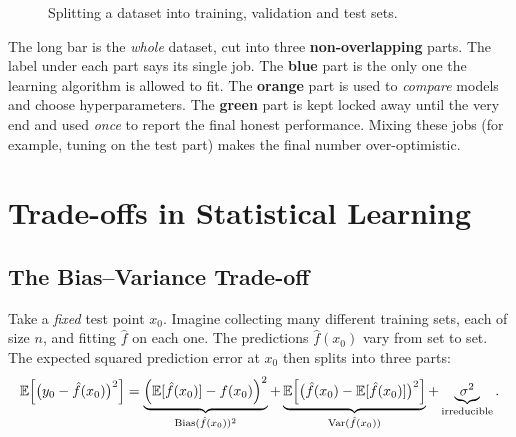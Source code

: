 \begin{figure}[!htbp]
\centering
{}
\caption{Splitting a dataset into training, validation and test sets.}\label{fig:split}
\end{figure}

\begin{explain}
The long bar is the \emph{whole} dataset, cut into three \textbf{non-overlapping} parts. The label under each part says its single job. The \textbf{blue} part is the only one the learning algorithm is allowed to fit. The \textbf{orange} part is used to \emph{compare} models and choose hyperparameters. The \textbf{green} part is kept locked away until the very end and used \emph{once} to report the final honest performance. Mixing these jobs (for example, tuning on the test part) makes the final number over-optimistic.
\end{explain}

\section{Trade-offs in Statistical Learning}

\subsection{The Bias--Variance Trade-off}

Take a \emph{fixed} test point $x_0$. Imagine collecting many different training sets, each of size $n$, and fitting $\hat f$ on each one. The predictions $\hat f(x_0)$ vary from set to set. The expected squared prediction error at $x_0$ then splits into three parts:
\begin{equation}\label{eq:bv}
  \mathbb{E}\Big[\big(y_0-\hat f(x_0)\big)^2\Big]
  =\underbrace{\Big(\mathbb{E}[\hat f(x_0)]-f(x_0)\Big)^2}_{\operatorname{Bias}(\hat f(x_0))^2}
  +\underbrace{\mathbb{E}\Big[\big(\hat f(x_0)-\mathbb{E}[\hat f(x_0)]\big)^2\Big]}_{\operatorname{Var}(\hat f(x_0))}
  +\underbrace{\sigma^2}_{\text{irreducible}} .
\end{equation}

